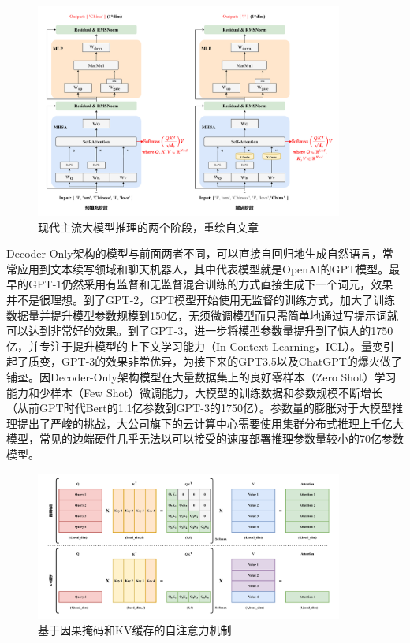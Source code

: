 \begin{figure}[!htbp]
	\centering
    \includegraphics[width=0.9\textwidth]{figures/Infer.pdf}
	\caption[现代主流大模型推理的两个阶段]{现代主流大模型推理的两个阶段，重绘自文章\cite{LLMInferSurveyTsingHua}}
    \label{LLMInfer}
\end{figure}

Decoder-Only架构的模型与前面两者不同，可以直接自回归地生成自然语言，常常应用到文本续写领域和聊天机器人，其中代表模型就是OpenAI的GPT模型。最早的GPT-1\cite{GPT-1}仍然采用有监督和无监督混合训练的方式直接生成下一个词元，效果并不是很理想。到了GPT-2\cite{GPT-2}，GPT模型开始使用无监督的训练方式，加大了训练数据量并提升模型参数规模到150亿，无须微调模型而只需简单地通过写提示词就可以达到非常好的效果。到了GPT-3\cite{GPT-3}，进一步将模型参数量提升到了惊人的1750亿，并专注于提升模型的上下文学习能力（In-Context-Learning，ICL）。量变引起了质变，GPT-3的效果非常优异，为接下来的GPT3.5以及ChatGPT的爆火做了铺垫。因Decoder-Only架构模型在大量数据集上的良好零样本（Zero Shot）学习能力\cite{Zero-Shot}和少样本（Few Shot）微调能力\cite{Few-Shot}，大模型的训练数据和参数规模不断增长（从前GPT时代Bert的1.1亿参数到GPT-3的1750亿）。参数量的膨胀对于大模型推理提出了严峻的挑战，大公司旗下的云计算中心需要使用集群分布式推理上千亿大模型，常见的边端硬件几乎无法以可以接受的速度部署推理参数量较小的70亿参数模型。

\begin{figure}[!htbp]
	\centering
    \includegraphics[width=0.9\textwidth]{figures/KVCache.pdf}
    \caption{基于因果掩码和KV缓存的自注意力机制}
	\label{KVCache}
\end{figure}

